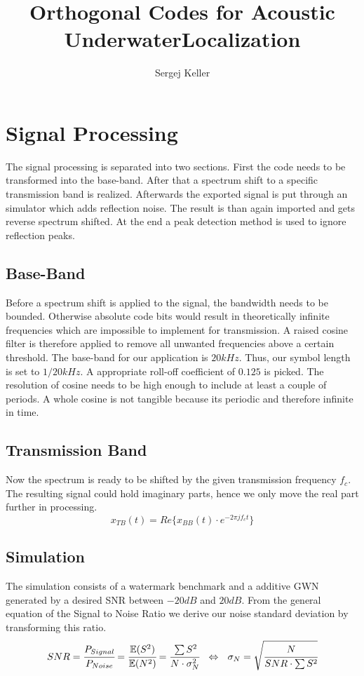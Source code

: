 \documentclass[en,abstract,acknowledgment,symbollist,inputenc=utf8]{tuhhthesis}
\author{Sergej Keller}
\title{Orthogonal Codes for Acoustic UnderwaterLocalization}
\institute{InstAutonomousCPS}
\begin{document}



\chapter{Signal Processing}
The signal processing is separated into two sections. First the code needs to be transformed into the base-band. After that a spectrum shift to a specific transmission band is realized. Afterwards the exported signal is put through an simulator which adds reflection noise. The result is than again imported and gets reverse spectrum shifted. At the end a peak detection method is used to ignore reflection peaks.
\section{Base-Band}
Before a spectrum shift is applied to the signal, the bandwidth needs to be bounded. Otherwise absolute code bits would result in theoretically infinite frequencies which are impossible to implement for transmission. A raised cosine filter is therefore applied to remove all unwanted frequencies above a certain threshold. The base-band for our application is $20kHz$. Thus, our symbol length is set to $1/{20kHz}$. A appropriate roll-off coefficient of $0.125$ is picked. The resolution of cosine needs to be high enough to include at least a couple of periods.  A whole cosine is not tangible because its periodic and therefore infinite in time.
\section{Transmission Band}
Now the spectrum is ready to be shifted by the given transmission frequency $f_c$. The resulting signal could hold imaginary parts, hence we only move the real part further in processing. 
\begin{equation}
 	x_{TB}(t)=Re\{x_{BB}(t)\cdot e^{-2\pi j f_c t}\}
\end{equation}
\section{Simulation}
The simulation consists of a watermark benchmark \cite{watermark15} and a additive GWN generated by a desired SNR between $-20dB$ and $20dB$. From the general equation of the Signal to Noise Ratio we derive our noise standard deviation by transforming this ratio.
\begin{equation}
	SNR=\cfrac{P_{Signal}}{P_{Noise}}=\cfrac{\mathbb{E}(S^2)}{\mathbb{E}(N^2)}=\cfrac{\sum S^2}{N\cdot\sigma_N^2}~~\Leftrightarrow~~\sigma_N=\sqrt{\cfrac{N}{SNR\cdot\sum S^2}}
\end{equation}
\end{document}
